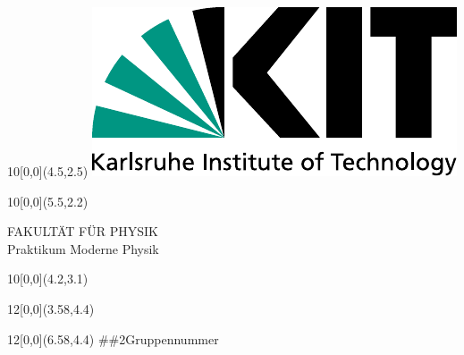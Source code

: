 \newcommand{\diameter}{20}
\newcommand{\xone}{-15}
\newcommand{\xtwo}{160}
\newcommand{\yone}{15}
\newcommand{\ytwo}{-253}

\newcommand{\hoehea}{60}
\newcommand{\hoeheb}{60}




\begin{titlepage}

    \begin{textblock}{10}[0,0](4.5,2.5)
        \includegraphics[width=.25\textwidth]{00-include/kitlogo.pdf}
    \end{textblock}
    \begin{textblock}{10}[0,0](5.5,2.2)
        \begin{flushright}
            \Large FAKULTÄT FÜR PHYSIK\\Praktikum Moderne Physik
        \end{flushright}
    \end{textblock}

    \begin{textblock}{10}[0,0](4.2,3.1)
    \end{textblock}

    \Large
    \begin{textblock}{12}[0,0](3.58,4.4)
    \end{textblock}
    \begin{textblock}{12}[0,0](6.58,4.4)
                   {\#\#}{2}{Gruppennummer}
    \end{textblock}


\end{titlepage}
